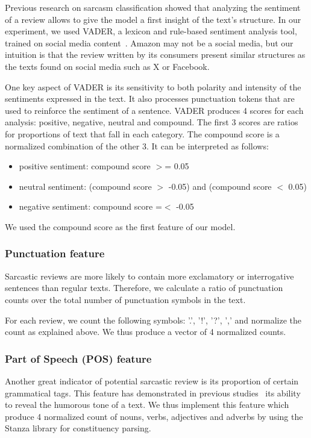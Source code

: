 \documentclass[10pt,twocolumn,letterpaper]{article}
\begin{document}
Previous research on sarcasm classification showed that analyzing the sentiment of a review allows to give the model a first insight of the text's structure.
In our experiment, we used VADER, a lexicon and rule-based sentiment analysis tool, trained on social media content~\cite{icwsm2014}.
Amazon may not be a social media, but our intuition is that the review written by its consumers present similar structures as the texts found on social media such as X or Facebook.

One key aspect of VADER is its sensitivity to both polarity and intensity of the sentiments expressed in the text.
It also processes punctuation tokens that are used to reinforce the sentiment of a sentence.
VADER produces 4 scores for each analysis: positive, negative, neutral and compound.
The first 3 scores are ratios for proportions of text that fall in each category. The compound score is a normalized combination of the other 3.
It can be interpreted as follows:

\begin{itemize}
    \item positive sentiment: compound score $>$= 0.05
    \item neutral sentiment: (compound score $>$ -0.05) and (compound score $<$ 0.05)
    \item negative sentiment: compound score =$<$ -0.05
\end{itemize}

We used the compound score as the first feature of our model.

\subsubsection{Punctuation feature}

Sarcastic reviews are more likely to contain more exclamatory or interrogative sentences than regular texts.
Therefore, we calculate a ratio of punctuation counts over the total number of punctuation symbols in the text.

For each review, we count the following symbols: '.', '!', '?', ',' and normalize the count as explained above.
We thus produce a vector of 4 normalized counts.

\subsubsection{Part of Speech (POS) feature}

Another great indicator of potential sarcastic review is its proportion of certain grammatical tags.
This feature has demonstrated in previous studies~\cite{jain2019} its ability to reveal the humorous tone of a text.
We thus implement this feature which produce 4 normalized count of nouns, verbs, adjectives and adverbs by using the Stanza library for constituency parsing.
\end{document}
